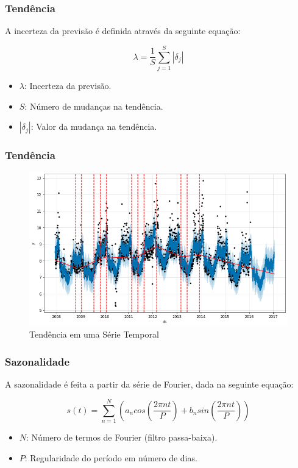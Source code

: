 \documentclass{beamer}
\begin{document}
\begin{frame}
\frametitle{Tendência}
A incerteza da previsão é definida através da seguinte equação:

\begin{equation}
    \lambda = \frac{1}{S} \sum_{j=1}^S |\delta_j|
\end{equation}

\begin{itemize}
    \item $\lambda$: Incerteza da previsão.
    \item $S$: Número de mudanças na tendência.
    \item $|\delta_j|$: Valor da mudança na tendência.
\end{itemize}
\end{frame}


\begin{frame}
\frametitle{Tendência}

\begin{figure}
    \centering
    \includegraphics[width=0.8\linewidth]{tendencia.png}
    \caption{Tendência em uma Série Temporal}
\end{figure}
\end{frame}


\begin{frame}
\frametitle{Sazonalidade}
A sazonalidade é feita a partir da série de Fourier, dada na seguinte equação:

\begin{equation}
    s(t) = \sum_{n=1}^N \left( a_n cos \left( \frac{2 \pi nt}{P} \right) + b_n sin \left( \frac{2 \pi nt}{P} \right) \right)
\end{equation}

\begin{itemize}
    \item $N$: Número de termos de Fourier (filtro passa-baixa).
    \item $P$: Regularidade do período em número de dias.
\end{itemize}
\end{frame}
\end{document}
